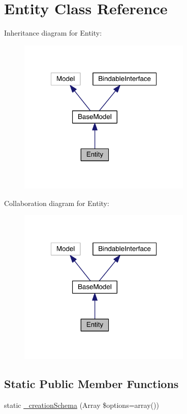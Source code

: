 \hypertarget{class_entity_1_1_entity}{\section{Entity Class Reference}
\label{class_entity_1_1_entity}
}


Inheritance diagram for Entity\-:
\nopagebreak
\begin{figure}[H]
\begin{center}
\leavevmode
\includegraphics[width=234pt]{class_entity_1_1_entity__inherit__graph}
\end{center}
\end{figure}


Collaboration diagram for Entity\-:
\nopagebreak
\begin{figure}[H]
\begin{center}
\leavevmode
\includegraphics[width=234pt]{class_entity_1_1_entity__coll__graph}
\end{center}
\end{figure}
\subsection*{Static Public Member Functions}
\begin{DoxyCompactItemize}
\item 
static \hyperlink{class_entity_1_1_entity_a0c47f287a3df4cf59d56b00b761a603c}{\-\_\-creation\-Schema} (Array \$options=array())
\end{DoxyCompactItemize}
